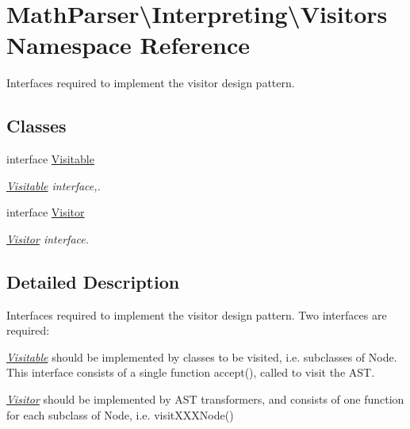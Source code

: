 \hypertarget{namespaceMathParser_1_1Interpreting_1_1Visitors}{\section{Math\-Parser\textbackslash{}Interpreting\textbackslash{}Visitors Namespace Reference}
\label{namespaceMathParser_1_1Interpreting_1_1Visitors}
}


Interfaces required to implement the visitor design pattern.  


\subsection*{Classes}
\begin{DoxyCompactItemize}
\item 
interface \hyperlink{interfaceMathParser_1_1Interpreting_1_1Visitors_1_1Visitable}{Visitable}
\begin{DoxyCompactList}\small\item\em \hyperlink{interfaceMathParser_1_1Interpreting_1_1Visitors_1_1Visitable}{Visitable} interface,. \end{DoxyCompactList}\item 
interface \hyperlink{interfaceMathParser_1_1Interpreting_1_1Visitors_1_1Visitor}{Visitor}
\begin{DoxyCompactList}\small\item\em \hyperlink{interfaceMathParser_1_1Interpreting_1_1Visitors_1_1Visitor}{Visitor} interface. \end{DoxyCompactList}\end{DoxyCompactItemize}


\subsection{Detailed Description}
Interfaces required to implement the visitor design pattern. Two interfaces are required\-:
\begin{DoxyItemize}
\item {\itshape \hyperlink{interfaceMathParser_1_1Interpreting_1_1Visitors_1_1Visitable}{Visitable}} should be implemented by classes to be visited, i.\-e. subclasses of Node. This interface consists of a single function {\ttfamily accept()}, called to visit the A\-S\-T.
\item {\itshape \hyperlink{interfaceMathParser_1_1Interpreting_1_1Visitors_1_1Visitor}{Visitor}} should be implemented by A\-S\-T transformers, and consists of one function for each subclass of Node, i.\-e. {\ttfamily visit\-X\-X\-X\-Node()} 
\end{DoxyItemize}